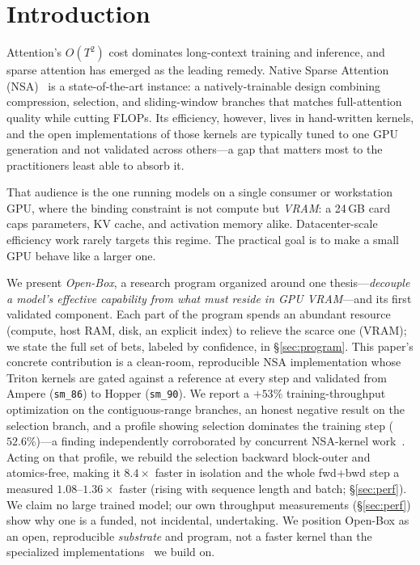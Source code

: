 \documentclass[11pt]{article}
\begin{document}
\section{Introduction}
Attention's $O(T^2)$ cost dominates long-context training and inference, and sparse attention has
emerged as the leading remedy. Native Sparse Attention (NSA)~\cite{nsa} is a state-of-the-art
instance: a natively-trainable design combining compression, selection, and sliding-window branches
that matches full-attention quality while cutting FLOPs. Its efficiency, however, lives in
hand-written kernels, and the open implementations of those kernels are typically tuned to one GPU
generation and not validated across others---a gap that matters most to the practitioners least able
to absorb it.

That audience is the one running models on a single consumer or workstation GPU, where the binding
constraint is not compute but \emph{VRAM}: a 24\,GB card caps parameters, KV cache, and activation
memory alike. Datacenter-scale efficiency work rarely targets this regime. The practical goal is to
make a small GPU behave like a larger one.

We present \emph{Open-Box}, a research program organized around one thesis---\emph{decouple a
model's effective capability from what must reside in GPU VRAM}---and its first validated component.
Each part of the program spends an abundant resource (compute, host RAM, disk, an explicit index) to
relieve the scarce one (VRAM); we state the full set of bets, labeled by confidence, in
\S\ref{sec:program}. This paper's concrete contribution is a clean-room, reproducible NSA
implementation whose Triton kernels are gated against a reference at every step and validated from
Ampere (\texttt{sm\_86}) to Hopper (\texttt{sm\_90}). We report a $+53\%$ training-throughput
optimization on the contiguous-range branches, an honest negative result on the selection branch,
and a profile showing selection dominates the training step ($52.6\%$)---a finding independently
corroborated by concurrent NSA-kernel work~\cite{fsa}. Acting on that profile, we rebuild the
selection backward block-outer and atomics-free, making it $8.4\times$ faster in isolation and the
whole fwd+bwd step a measured $1.08$--$1.36\times$ faster (rising with sequence length and batch;
\S\ref{sec:perf}). We claim no large trained model; our own
throughput measurements (\S\ref{sec:perf}) show why one is a funded, not incidental, undertaking. We
position Open-Box as an open, reproducible \emph{substrate} and program, not a faster kernel than
the specialized implementations~\cite{fsa,nosa} we build on.
\end{document}
